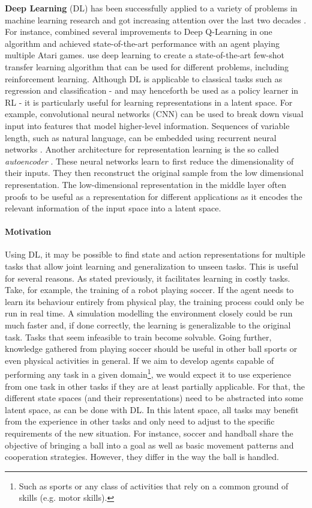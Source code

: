 \textbf{Deep Learning} (DL) has been successfully applied to a variety of problems in machine learning research and got increasing attention over the last two decades \citep{goodfellow2016deep}. For instance, \citet{hessel2017rainbow} combined several  improvements to Deep Q-Learning in one algorithm and achieved state-of-the-art performance with an agent playing multiple Atari games. \cite{finn2018model} use deep learning to create a state-of-the-art few-shot transfer learning algorithm that can be used for different problems, including reinforcement learning. Although DL is applicable to classical tasks such as regression and classification - and may henceforth be used as a policy learner in RL - it is particularly useful for learning representations in a latent space. For example, convolutional neural networks (CNN) can be used to break down visual input into features that model higher-level information. Sequences of variable length, such as natural language, can be embedded using recurrent neural networks \citep{goldberg2017neural}. Another architecture for representation learning is the so called \textit{autoencoder} \citep{hinton2006reducing}. These neural networks learn to first reduce the dimensionality of their inputs. They then reconstruct the original sample from the low dimensional representation. The low-dimensional representation in the middle layer often proofs to be useful as a representation for different applications as it encodes the relevant information of the input space into a latent space. 

\paragraph{Motivation} Using DL, it may be possible to find state and action representations for multiple tasks that allow joint learning and generalization to unseen tasks. This is useful for several reasons. As stated previously, it facilitates learning in costly tasks. Take, for example, the training of a robot playing soccer. If the agent needs to learn its behaviour entirely from physical play, the training process could only be run in real time. A simulation modelling the environment closely could be run much faster and, if done correctly, the learning is generalizable to the original task. Tasks that seem infeasible to train become solvable. Going further, knowledge gathered from playing soccer should be useful in other ball sports or even physical activities in general. If we aim to develop agents capable of performing any task in a given domain\footnote{Such as sports or any class of activities that rely on a common ground of skills (e.g. motor skills).}, we would expect it to use experience from one task in other tasks if they are at least partially applicable. For that, the different state spaces (and their representations) need to be abstracted into some latent space, as can be done with DL. In this latent space, all tasks may benefit from the experience in other tasks and only need to adjust to the specific requirements of the new situation. For instance, soccer and handball share the objective of bringing a ball into a goal as well as basic movement patterns and cooperation strategies. However, they differ in the way the ball is handled.

